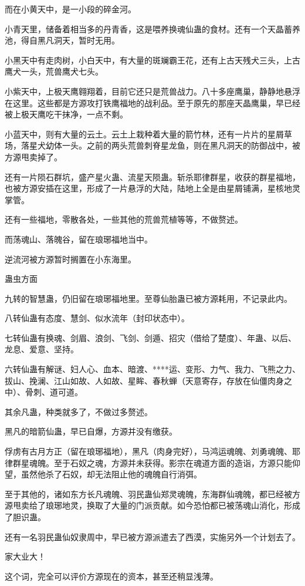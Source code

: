 \begin{this_body}
而在小黄天中，是一小段的碎金河。

小青天里，储备着相当多的丹青香，这是喂养换魂仙蛊的食材。还有一个天晶蓄养池，得自黑凡洞天，暂时无用。

小黑天中有走肉树，小白天中，有大量的斑斓霸王花，还有上古天残犬三头，上古鹰犬一头，荒兽鹰犬七头。

小紫天中，上极天鹰翱翔着，目前它还只是荒兽战力。八十多座鹰巢，静静地悬浮在这里。这些都是方源攻打铁鹰福地的战利品。至于原先的那座天晶鹰巢，早已经被上极天鹰吃干抹净，一点不剩。

小蓝天中，则有大量的云土。云土上栽种着大量的箭竹林，还有一片片的星屑草场，落星犬幼体一头。之前的两头荒兽刺脊星龙鱼，则在黑凡洞天的防御战中，被方源甩卖掉了。

还有一片陨石群坑，盛产星火蛊、流星天陨蛊。斩杀耶律群星，收获的群星福地，也被方源安插在这里，形成了一片悬浮的大陆，陆地上全是由星屑铺满，星核地灵掌管。

还有一些福地，零散各处，一些其他的荒兽荒植等等，不做赘述。

而荡魂山、落魄谷，留在琅琊福地当中。

逆流河被方源暂时搁置在小东海里。

蛊虫方面

九转的智慧蛊，仍旧留在琅琊福地里。至尊仙胎蛊已被方源耗用，不记录此内。

八转仙蛊有态度、慧剑、似水流年（封印状态中）。

七转仙蛊有换魂、剑眉、浪剑、飞剑、剑遁、招灾（借给了楚度）、年蛊、以后、龙息、爱意、坚持。

六转仙蛊有解谜、妇人心、血本、暗渡、****运、变形、力气、我力、飞熊之力、拔山、挽澜、江山如故、人如故、星眸、春秋蝉（天意寄存，存放在仙僵肉身之中）、骨刺、道可道。

其余凡蛊，种类就多了，不做过多赘述。

黑凡的暗箭仙蛊，早已自爆，方源并没有缴获。

俘虏有古月方正（留在琅琊福地），黑凡（肉身完好），马鸿运魂魄、刘勇魂魄、耶律群星魂魄。至于石奴之魂，方源并未获得。影宗在魂道方面的造诣，方源只能仰望，虽然他杀了石奴，却无法阻止他的魂魄自行消弭。

至于其他的，诸如东方长凡魂魄、羽民蛊仙郑灵魂魄，东海群仙魂魄，都已经被方源甩卖给了琅琊地灵，换取了大量的门派贡献。如今恐怕都已被荡魂山消化，形成了胆识蛊。

还有一名羽民蛊仙奴隶周中，早已被方源派遣去了西漠，实施另外一个计划去了。

家大业大！

这个词，完全可以评价方源现在的资本，甚至还稍显浅薄。


\end{this_body}
